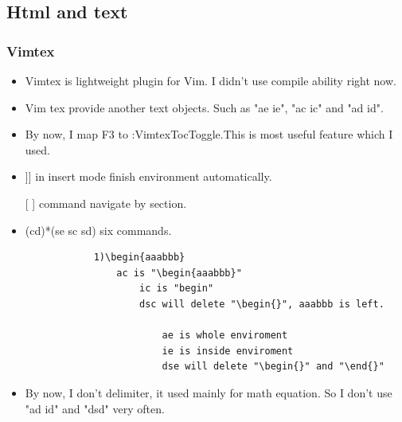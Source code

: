 \documentclass[paper=8.5in:11in, twoside, 12pt, pagesize=pdftex]{book}
\begin{document}
	\subsection{Html and text}
	
	\subsubsection{Vimtex}
	\begin{itemize}
		\item Vimtex is lightweight plugin for Vim. I didn't use compile ability right now. 
		
		\item Vim tex provide another text objects. Such as "ae ie", "ac ic" and "ad id". 
		
		\item By now, I map F3 to :VimtexTocToggle.This is most useful feature which I used. 
		
		\item ]] in insert mode finish environment automatically.
		
		\item [[ ]] command navigate by section.
		
		\item (cd)*(se sc sd) six commands. 
		\begin{verbatim}
			1)\begin{aaabbb}
				ac is "\begin{aaabbb}"
					ic is "begin"
					dsc will delete "\begin{}", aaabbb is left.
						
						ae is whole enviroment
						ie is inside enviroment
						dse will delete "\begin{}" and "\end{}" 
					\end{verbatim}
					\item By now, I don't delimiter, it used mainly for math equation. So I don't use "ad id" and "dsd" very often. 
				\end{itemize}
				
\end{document}
